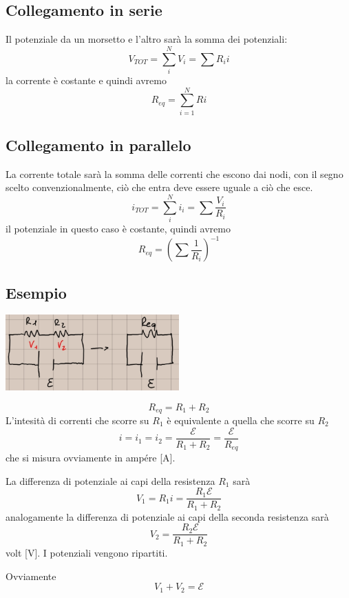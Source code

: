 \documentclass[a4paper, 12pt]{book}
\theoremstyle{plain}
\begin{document}
\subsection{Collegamento in serie}

Il potenziale da un morsetto e l'altro sarà la somma dei potenziali:
\[ V_{TOT} = \sum^N_i V_i = \sum R_i i \] la corrente è costante e quindi avremo 
\[ R_{eq} = \sum_{i = 1}^N Ri \]

\subsection{Collegamento in parallelo}

La corrente totale sarà la somma delle correnti che escono 
dai nodi, con il segno scelto convenzionalmente, ciò che 
entra deve essere uguale a ciò che esce. 
\[ i_{TOT} = \sum^N_i i_i = \sum \frac{V_i}{R_i} \] il potenziale 
in questo caso è costante, quindi avremo \[ R_{eq} = (\sum \frac{1}{R_i})^{-1} \]

\subsection{Esempio}

\begin{center}
    \includegraphics[width=0.5\textwidth]{es_serie.jpg}
\end{center}

\[ R_{eq} = R_1 + R_2 \] 
L'intesità di correnti che scorre su $R_1$ è equivalente a quella 
che scorre su $R_2$ \[ i = i_1 = i_2 = \frac{\mathcal{E}}{R_1 + R_2} = \frac{\mathcal{E}}{R_{eq}} \]
che si misura ovviamente in ampére [A].

La differenza di potenziale ai capi della resistenza $R_1$ sarà 
\[ V_1 = R_1i = \frac{R_1 \mathcal{E}}{R_1 + R_2} \] 
analogamente la differenza di potenziale ai capi della seconda 
resistenza sarà \[ V_2 = \frac{R_2 \mathcal{E}}{R_1 + R_2} \] 
volt [V]. I potenziali vengono ripartiti.

Ovviamente \[ V_1 + V_2 = \mathcal{E} \] 
\end{document}
